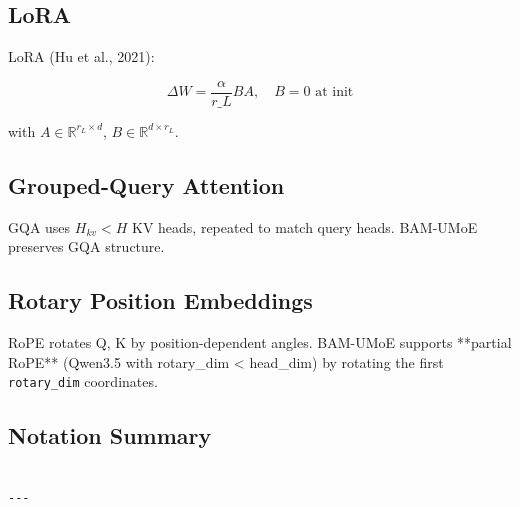 \subsection{LoRA}

LoRA (Hu et al., 2021):

\[
\Delta W = \frac{\alpha}{r\_L} B A, \quad B = 0 \text{ at init}
\]

with $A \in \mathbb{R}^{r_L \times d}$, $B \in \mathbb{R}^{d \times r_L}$.

\subsection{Grouped-Query Attention}

GQA uses $H_{kv} < H$ KV heads, repeated to match query heads. BAM-UMoE 
preserves GQA structure.

\subsection{Rotary Position Embeddings}

RoPE rotates Q, K by position-dependent angles. BAM-UMoE supports **partial 
RoPE** (Qwen3.5 with rotary\_dim \textless{} head\_dim) by rotating the first 
\texttt{rotary\_dim} coordinates.

\subsection{Notation Summary}

\begin{lstlisting}

---
\end{lstlisting}